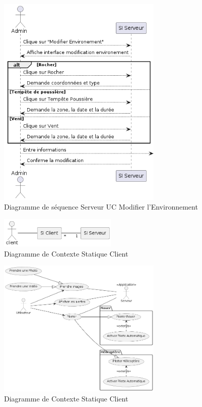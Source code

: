 \documentclass[12pt,a4paper]{scrartcl}
\begin{document}
\begin{figure}[h]
    \centering
    \includegraphics[width=0.7\textwidth]{diag_seq_admin_modif.png}
    \caption{Diagramme de séquence Serveur UC Modifier l'Environnement }\label{seq2_serv}
\end{figure}


\begin{figure}[h]
    \centering
    \includegraphics[width=0.5\textwidth]{Diag_CS_User.png}
    \caption{Diagramme de Contexte Statique Client }\label{cs_client}
\end{figure}

\begin{figure}[h]
    \centering
    \includegraphics[width=0.7\textwidth]{diag_uc_client.png}
    \caption{Diagramme de Contexte Statique Client }\label{uc_client}
\end{figure}
\end{document}
